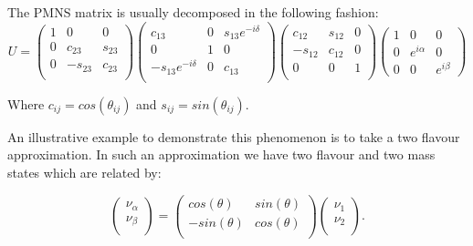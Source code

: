 The PMNS matrix is usually decomposed in the following fashion:
\begin{equation}
  U = 
  \begin{pmatrix}
    1 & 0 & 0 \\
    0 & c_{23} & s_{23} \\
    0 & -s_{23} & c_{23} \\
  \end{pmatrix}
  \begin{pmatrix}
    c_{13} & 0 & s_{13}e^{-i\delta} \\
    0 & 1 & 0 \\
    -s_{13}e^{-i\delta} & 0 & c_{13} \\
  \end{pmatrix}
  \begin{pmatrix}
    c_{12} & s_{12} & 0 \\
    -s_{12} & c_{12} & 0 \\
    0 & 0 & 1 \\
  \end{pmatrix}
  \begin{pmatrix}
    1 & 0 & 0 \\
    0 & e^{i\alpha} & 0 \\
    0 & 0 & e^{i\beta} 
  \end{pmatrix}
  \label{eq:particle-physics:pmns_matrix}
\end{equation}

\noindent
Where $c_{ij}=cos(\theta_{ij})$ and $s_{ij}=sin(\theta_{ij})$.

An illustrative example to demonstrate this phenomenon is to take a two flavour approximation. In such an approximation we have two flavour and two mass states which are related by:

\begin{equation}
  \begin{pmatrix}
    \nu_{\alpha} \\
    \nu_{\beta} \\
  \end{pmatrix}
  =
  \begin{pmatrix}
    cos(\theta) & sin(\theta) \\
    -sin(\theta) & cos(\theta) \\
  \end{pmatrix}
  \begin{pmatrix}
    \nu_{1} \\
    \nu_{2} \\
  \end{pmatrix}.
  \label{eq:particle-physics:neutrino-oscillation-two-flavour}
\end{equation}


